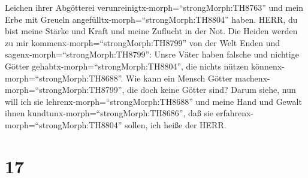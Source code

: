Leichen ihrer Abgötterei verunreinigtx-morph=``strongMorph:TH8763'' und
mein Erbe mit Greueln angefülltx-morph=``strongMorph:TH8804'' haben.
 HERR, du bist meine Stärke und Kraft und meine Zuflucht in
der Not. Die Heiden werden zu mir kommenx-morph=``strongMorph:TH8799''
von der Welt Enden und sagenx-morph=``strongMorph:TH8799'': Unsre Väter
haben falsche und nichtige Götter gehabtx-morph=``strongMorph:TH8804'',
die nichts nützen könnenx-morph=``strongMorph:TH8688''. 
Wie kann ein Mensch Götter machenx-morph=``strongMorph:TH8799'', die
doch keine Götter sind?  Darum siehe, nun will ich sie
lehrenx-morph=``strongMorph:TH8688'' und meine Hand und Gewalt ihnen
kundtunx-morph=``strongMorph:TH8686'', daß sie
erfahrenx-morph=``strongMorph:TH8804'' sollen, ich heiße der HERR.

\hypertarget{section-16}{%
\section{17}\label{section-16}}

